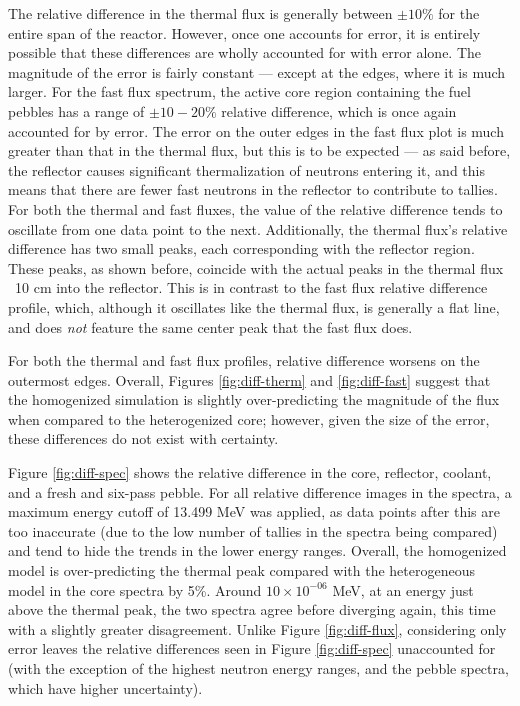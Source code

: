 The relative difference in the thermal flux is generally between $\pm 10\%$ for the entire span of the reactor.  However, once one accounts for error, it is entirely possible that these differences are wholly accounted for with error alone.  The magnitude of the error is fairly constant --- except at the edges, where it is much larger.  For the fast flux spectrum, the active core region containing the fuel pebbles has a range of $\pm 10-20\%$ relative difference, which is once again accounted for by error.  The error on the outer edges in the fast flux plot is much greater than that in the thermal flux, but this is to be expected --- as said before, the reflector causes significant thermalization of neutrons entering it, and this means that there are fewer fast neutrons in the reflector to contribute to tallies.  For both the thermal and fast fluxes, the value of the relative difference tends to oscillate from one data point to the next.  Additionally, the thermal flux's relative difference has two small peaks, each corresponding with the reflector region.  These peaks, as shown before, coincide with the actual peaks in the thermal flux ~10 cm into the reflector.  This is in contrast to the fast flux relative difference profile, which, although it oscillates like the thermal flux, is generally a flat line, and does \emph{not} feature the same center peak that the fast flux does.

For both the thermal and fast flux profiles, relative difference worsens on the outermost edges.  Overall, Figures \ref{fig:diff-therm} and \ref{fig:diff-fast} suggest that the homogenized simulation is slightly over-predicting the magnitude of the flux when compared to the heterogenized core; however, given the size of the error, these differences do not exist with certainty.




Figure \ref{fig:diff-spec} shows the relative difference in the core, reflector, coolant, and a fresh and six-pass pebble. For all relative difference images in the spectra, a maximum energy cutoff of 13.499 MeV was applied, as data points after this are too inaccurate (due to the low number of tallies in the spectra being compared) and tend to hide the trends in the lower energy ranges.  Overall, the homogenized model is over-predicting the thermal peak compared with the heterogeneous model in the core spectra by 5\%.  Around $10\times10^{-06}$ MeV, at an energy just above the thermal peak, the two spectra agree before diverging again, this time with a slightly greater disagreement.  Unlike Figure \ref{fig:diff-flux}, considering only error leaves the relative differences seen in Figure \ref{fig:diff-spec} unaccounted for (with the exception of the highest neutron energy ranges, and the pebble spectra, which have higher uncertainty).

